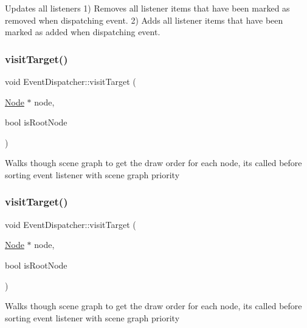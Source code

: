 Updates all listeners 1) Removes all listener items that have been marked as \textquotesingle{}removed\textquotesingle{} when dispatching event. 2) Adds all listener items that have been marked as \textquotesingle{}added\textquotesingle{} when dispatching event. \mbox{\label{classEventDispatcher_a3ff088a3e3479d3ffd661c5918bff912}} 
\subsubsection{\texorpdfstring{visit\+Target()}{visitTarget()}\hspace{0.1cm}{\footnotesize\ttfamily [1/2]}}
{\footnotesize\ttfamily void Event\+Dispatcher\+::visit\+Target (\begin{DoxyParamCaption}\item[{\hyperlink{classNode}{Node} $\ast$}]{node,  }\item[{bool}]{is\+Root\+Node }\end{DoxyParamCaption})\hspace{0.3cm}{\ttfamily [protected]}}

Walks though scene graph to get the draw order for each node, it\textquotesingle{}s called before sorting event listener with scene graph priority \mbox{\label{classEventDispatcher_a3ff088a3e3479d3ffd661c5918bff912}} 
\subsubsection{\texorpdfstring{visit\+Target()}{visitTarget()}\hspace{0.1cm}{\footnotesize\ttfamily [2/2]}}
{\footnotesize\ttfamily void Event\+Dispatcher\+::visit\+Target (\begin{DoxyParamCaption}\item[{\hyperlink{classNode}{Node} $\ast$}]{node,  }\item[{bool}]{is\+Root\+Node }\end{DoxyParamCaption})\hspace{0.3cm}{\ttfamily [protected]}}

Walks though scene graph to get the draw order for each node, it\textquotesingle{}s called before sorting event listener with scene graph priority 

